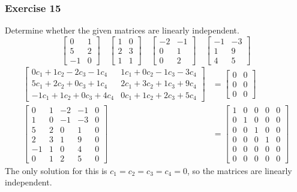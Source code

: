 \documentclass[letterpaper, 12pt]{math}
\begin{document}
\subsubsection*{Exercise 15}
Determine whether the given matrices are linearly independent.
\[ \begin{bmatrix} 0 & 1 \\ 5 & 2 \\ -1 & 0\end{bmatrix} \quad
  \begin{bmatrix}1 & 0 \\ 2 & 3 \\ 1 & 1\end{bmatrix} \quad
  \begin{bmatrix}-2 & -1 \\ 0 & 1 \\ 0 & 2\end{bmatrix} \quad
  \begin{bmatrix}-1 & -3 \\ 1 & 9 \\ 4 & 5\end{bmatrix} \]
\begin{align*}
  \begin{bmatrix}
    0c_1+1c_2-2c_3-1c_4 & 1c_1+0c_2-1c_3-3c_4 \\
    5c_1+2c_2+0c_3+1c_4 & 2c_1+3c_2+1c_3+9c_4 \\
    -1c_1+1c_2+0c_3+4c_4 & 0c_1+1c_2+2c_3+5c_4
  \end{bmatrix} &= \begin{bmatrix}
    0 & 0 \\
    0 & 0 \\
    0 & 0
  \end{bmatrix} \\
  \begin{bmatrix}
    0 & 1 & -2 & -1 & 0 \\
    1 & 0 & -1 & -3 & 0 \\
    5 & 2 & 0 & 1 & 0 \\
    2 & 3 & 1 & 9 & 0 \\
    -1 & 1 & 0 & 4 & 0 \\
    0 & 1 & 2 & 5 & 0
  \end{bmatrix} &= \begin{bmatrix}
    1 & 0 & 0 & 0 & 0 \\
    0 & 1 & 0 & 0 & 0 \\
    0 & 0 & 1 & 0 & 0 \\
    0 & 0 & 0 & 1 & 0 \\
    0 & 0 & 0 & 0 & 0 \\
    0 & 0 & 0 & 0 & 0
  \end{bmatrix}
\end{align*}
The only solution for this is \( c_1 = c_2 = c_3 = c_4 = 0 \), so the matrices
are linearly independent.
\end{document}
